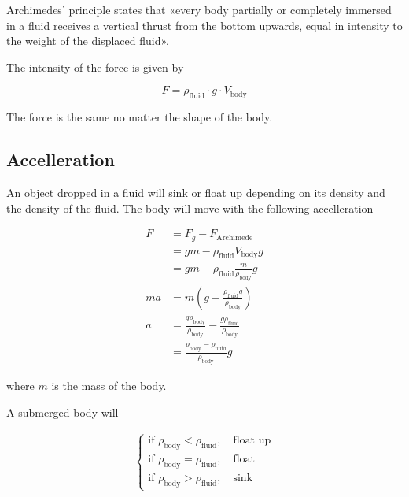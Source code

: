 \documentclass{article}
\begin{document}
Archimedes' principle states that
«every body partially or completely immersed in a fluid receives a
vertical thrust from the bottom upwards,
equal in intensity to the weight of the displaced fluid».

The intensity of the force is given by

\[
    F = \rho_\text{fluid} \cdot g \cdot V_\text{body}
\]

The force is the same no matter the shape of the body.

\subsection{Accelleration}

An object dropped in a fluid will sink or float up
depending on its density and the density of the fluid.
The body will move with the following accelleration

\begin{align*}
    F &= F_g - F_\text{Archimede} \\
    &= gm - \rho_\text{fluid}V_\text{body}g \\
    &= gm - \rho_\text{fluid}\frac{m}{\rho_\text{body}}g \\
    ma &= m \left( g- \frac{\rho_\text{fluid}g}{\rho_\text{body}} \right) \\
    a &= \frac{g\rho_\text{body}}{\rho_\text{body}} - \frac{g\rho_\text{fluid}}{\rho_\text{body}} \\
    &= \frac{\rho_\text{body} - \rho_\text{fluid}}{\rho_\text{body}}g
\end{align*}

where \(m\) is the mass of the body.

A submerged body will

\begin{align*}
	\begin{cases}
        \text{if } \rho_\text{body} < \rho_\text{fluid},\quad \text{float up} \\
        \text{if } \rho_\text{body} = \rho_\text{fluid},\quad \text{float} \\
        \text{if } \rho_\text{body} > \rho_\text{fluid},\quad \text{sink}
	\end{cases}
\end{align*}

\pagebreak
\end{document}
